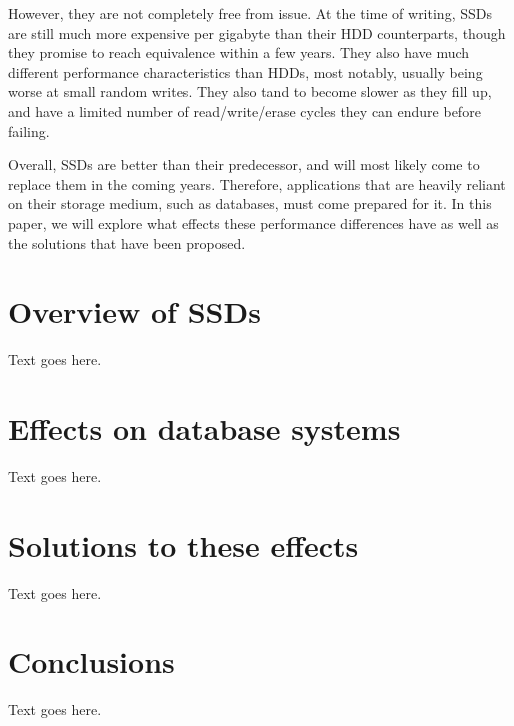 \documentclass[format=acmsmall, review=false, screen=true]{acmart}
\begin{document}
However, they are not completely free from issue. At the time of writing, SSDs are still much more expensive per gigabyte 
than their HDD counterparts, though they promise to reach equivalence within a few years. They also have much different 
performance characteristics than HDDs, most notably, usually being worse at small random writes. They also tand to become 
slower as they fill up, and have a limited number of read/write/erase cycles they can endure before failing. 
\cite{Xie2011, Dumitru2007}

Overall, SSDs are better than their predecessor, and will most likely come to replace them in the coming years. Therefore, 
applications that are heavily reliant on their storage medium, such as databases, must come prepared for it. In this paper, 
we will explore what effects these performance differences have as well as the solutions that have been proposed.

\section{Overview of SSDs}

Text goes here.

\section{Effects on database systems}

Text goes here.

\section{Solutions to these effects}

Text goes here.

\section{Conclusions}

Text goes here.



\end{document}

